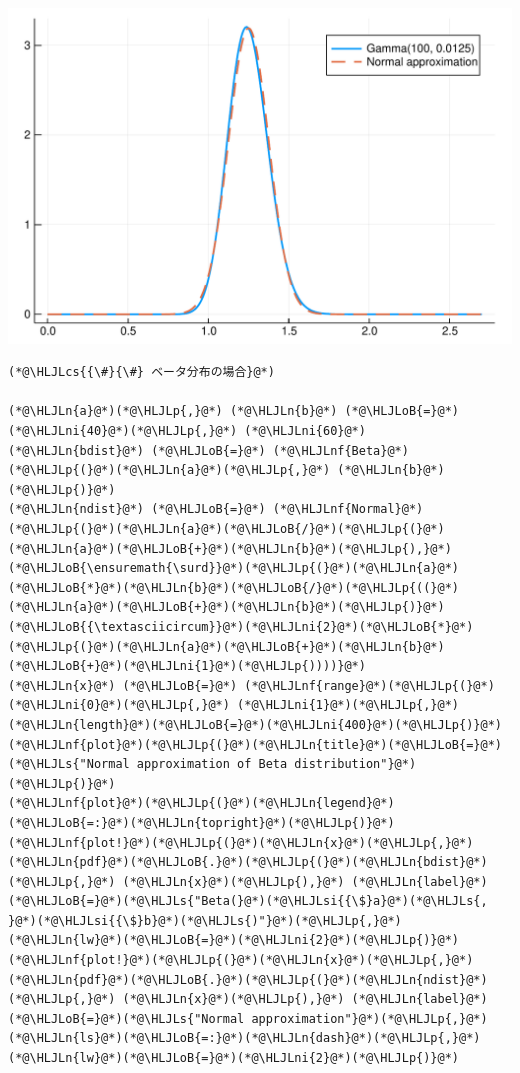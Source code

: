 \documentclass[12pt,a4paper,xelatex,ja=standard]{bxjsarticle}
\newcommand{\HLJLn}[1]{#1}
\newcommand{\HLJLnf}[1]{\textcolor[RGB]{66,102,213}{#1}}
\newcommand{\HLJLs}[1]{\textcolor[RGB]{201,61,57}{#1}}
\newcommand{\HLJLsi}[1]{#1}
\newcommand{\HLJLni}[1]{\textcolor[RGB]{59,151,46}{#1}}
\newcommand{\HLJLoB}[1]{\textcolor[RGB]{102,102,102}{\textbf{#1}}}
\newcommand{\HLJLp}[1]{#1}
\newcommand{\HLJLcs}[1]{\textcolor[RGB]{153,153,119}{\textit{#1}}}
\begin{document}
\begin{center}
\includegraphics[width=0.8\linewidth]{figures/テスト_3_1.pdf}
\end{center}

\begin{lstlisting}
(*@\HLJLcs{{\#}{\#} ベータ分布の場合}@*)

(*@\HLJLn{a}@*)(*@\HLJLp{,}@*) (*@\HLJLn{b}@*) (*@\HLJLoB{=}@*) (*@\HLJLni{40}@*)(*@\HLJLp{,}@*) (*@\HLJLni{60}@*)
(*@\HLJLn{bdist}@*) (*@\HLJLoB{=}@*) (*@\HLJLnf{Beta}@*)(*@\HLJLp{(}@*)(*@\HLJLn{a}@*)(*@\HLJLp{,}@*) (*@\HLJLn{b}@*)(*@\HLJLp{)}@*)
(*@\HLJLn{ndist}@*) (*@\HLJLoB{=}@*) (*@\HLJLnf{Normal}@*)(*@\HLJLp{(}@*)(*@\HLJLn{a}@*)(*@\HLJLoB{/}@*)(*@\HLJLp{(}@*)(*@\HLJLn{a}@*)(*@\HLJLoB{+}@*)(*@\HLJLn{b}@*)(*@\HLJLp{),}@*) (*@\HLJLoB{\ensuremath{\surd}}@*)(*@\HLJLp{(}@*)(*@\HLJLn{a}@*)(*@\HLJLoB{*}@*)(*@\HLJLn{b}@*)(*@\HLJLoB{/}@*)(*@\HLJLp{((}@*)(*@\HLJLn{a}@*)(*@\HLJLoB{+}@*)(*@\HLJLn{b}@*)(*@\HLJLp{)}@*)(*@\HLJLoB{{\textasciicircum}}@*)(*@\HLJLni{2}@*)(*@\HLJLoB{*}@*)(*@\HLJLp{(}@*)(*@\HLJLn{a}@*)(*@\HLJLoB{+}@*)(*@\HLJLn{b}@*)(*@\HLJLoB{+}@*)(*@\HLJLni{1}@*)(*@\HLJLp{))))}@*)
(*@\HLJLn{x}@*) (*@\HLJLoB{=}@*) (*@\HLJLnf{range}@*)(*@\HLJLp{(}@*)(*@\HLJLni{0}@*)(*@\HLJLp{,}@*) (*@\HLJLni{1}@*)(*@\HLJLp{,}@*) (*@\HLJLn{length}@*)(*@\HLJLoB{=}@*)(*@\HLJLni{400}@*)(*@\HLJLp{)}@*)
(*@\HLJLnf{plot}@*)(*@\HLJLp{(}@*)(*@\HLJLn{title}@*)(*@\HLJLoB{=}@*)(*@\HLJLs{"Normal approximation of Beta distribution"}@*)(*@\HLJLp{)}@*)
(*@\HLJLnf{plot}@*)(*@\HLJLp{(}@*)(*@\HLJLn{legend}@*)(*@\HLJLoB{=:}@*)(*@\HLJLn{topright}@*)(*@\HLJLp{)}@*)
(*@\HLJLnf{plot!}@*)(*@\HLJLp{(}@*)(*@\HLJLn{x}@*)(*@\HLJLp{,}@*) (*@\HLJLn{pdf}@*)(*@\HLJLoB{.}@*)(*@\HLJLp{(}@*)(*@\HLJLn{bdist}@*)(*@\HLJLp{,}@*) (*@\HLJLn{x}@*)(*@\HLJLp{),}@*) (*@\HLJLn{label}@*)(*@\HLJLoB{=}@*)(*@\HLJLs{"Beta(}@*)(*@\HLJLsi{{\$}a}@*)(*@\HLJLs{, }@*)(*@\HLJLsi{{\$}b}@*)(*@\HLJLs{)"}@*)(*@\HLJLp{,}@*) (*@\HLJLn{lw}@*)(*@\HLJLoB{=}@*)(*@\HLJLni{2}@*)(*@\HLJLp{)}@*)
(*@\HLJLnf{plot!}@*)(*@\HLJLp{(}@*)(*@\HLJLn{x}@*)(*@\HLJLp{,}@*) (*@\HLJLn{pdf}@*)(*@\HLJLoB{.}@*)(*@\HLJLp{(}@*)(*@\HLJLn{ndist}@*)(*@\HLJLp{,}@*) (*@\HLJLn{x}@*)(*@\HLJLp{),}@*) (*@\HLJLn{label}@*)(*@\HLJLoB{=}@*)(*@\HLJLs{"Normal approximation"}@*)(*@\HLJLp{,}@*) (*@\HLJLn{ls}@*)(*@\HLJLoB{=:}@*)(*@\HLJLn{dash}@*)(*@\HLJLp{,}@*) (*@\HLJLn{lw}@*)(*@\HLJLoB{=}@*)(*@\HLJLni{2}@*)(*@\HLJLp{)}@*)
\end{lstlisting}
\end{document}
